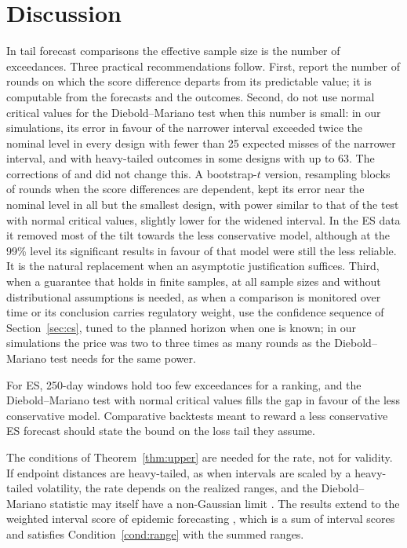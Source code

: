 \documentclass[11pt]{article}
\theoremstyle{remark}
\theoremstyle{definition}
\begin{document}


\section{Discussion}
\label{sec:discussion}

In tail forecast comparisons the effective sample size is the number of
exceedances. Three practical recommendations follow. First, report the
number of rounds on which the score difference departs from its predictable
value; it is computable from the forecasts and the outcomes. Second, do not
use normal critical values for the Diebold--Mariano test when this number
is small: in our simulations, its error in favour of the narrower interval
exceeded twice the nominal level in every design with fewer than 25
expected misses of the narrower interval, and with heavy-tailed outcomes in
some designs with up to 63. The corrections of \citet{harvey1997testing}
and \citet{coroneo2020comparing} did not change this. A bootstrap-$t$
version, resampling blocks of rounds when the score differences are
dependent, kept its error near the nominal level in all but the smallest
design, with power similar to that of the test with normal critical
values, slightly lower for the widened interval. In the ES data it removed most of the
tilt towards the less conservative model, although at the 99\% level its
significant results in favour of that model were still the less reliable.
It is the natural replacement when an asymptotic justification suffices. Third, when a guarantee that holds in
finite samples, at all sample sizes and without distributional assumptions
is needed, as when a comparison is monitored over time or its conclusion
carries regulatory weight, use the confidence sequence of
Section~\ref{sec:cs}, tuned to the planned horizon when one is known; in
our simulations the price was two to three times as many rounds as the
Diebold--Mariano test needs for the same power.

For ES, 250-day windows hold too few exceedances for a ranking, and the
Diebold--Mariano test with normal critical values fills the gap in favour
of the less conservative model. Comparative backtests meant to reward a less conservative ES
forecast should state the bound on the loss tail they assume.

The conditions of Theorem~\ref{thm:upper} are needed for the rate, not for
validity. If endpoint distances are heavy-tailed, as when intervals are
scaled by a heavy-tailed volatility, the rate depends on the realized
ranges, and the Diebold--Mariano statistic may itself have a non-Gaussian
limit \citep{frederiksen2026heavy}. The results extend to the weighted
interval score of epidemic forecasting \citep{bracher2021evaluating}, which
is a sum of interval scores and satisfies Condition~\ref{cond:range} with
the summed ranges.
\end{document}
